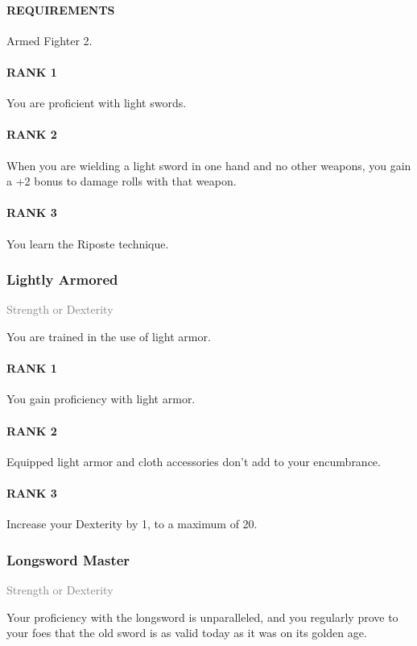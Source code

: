 \paragraph{REQUIREMENTS} Armed Fighter 2.
\paragraph{RANK 1} You are proficient with light swords.
\paragraph{RANK 2} When you are wielding a light sword in one hand and no other weapons, you gain a +2 bonus to damage rolls with that weapon.
\paragraph{RANK 3} You learn the Riposte technique.

\subsubsection{Lightly Armored} \label{feat::lightlyarmored}
\small{\textcolor{gray}{Strength or Dexterity}}

\normalsize
You are trained in the use of light armor.
\paragraph{RANK 1} You gain proficiency with light armor.
\paragraph{RANK 2} Equipped light armor and cloth accessories don't add to your encumbrance.
\paragraph{RANK 3} Increase your Dexterity by 1, to a maximum of 20.

\subsubsection{Longsword Master} \label{feat::longswordmaster}
\small{\textcolor{gray}{Strength or Dexterity}}

\normalsize
Your proficiency with the longsword is unparalleled, and you regularly prove to your foes that the old sword is as valid today as it was on its golden age.
